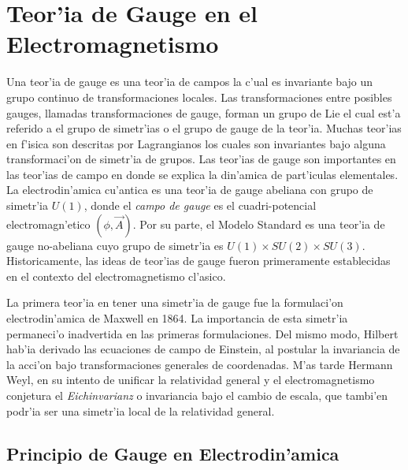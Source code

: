\chapter{Teor'ia de Gauge en el Electromagnetismo}
Una teor'ia de gauge es una teor'ia de campos la c'ual es invariante bajo un grupo continuo de transformaciones locales. Las transformaciones entre posibles gauges, llamadas transformaciones de gauge, forman un grupo de Lie el cual est'a referido a el grupo de simetr'ias o el grupo de gauge de la teor'ia.
Muchas teor'ias en f'isica son descritas por Lagrangianos los cuales son invariantes bajo alguna transformaci'on de simetr'ia de grupos. Las teor'ias de gauge son importantes en las teor'ias de campo en donde se explica la din'amica de part'iculas elementales. La electrodin'amica cu'antica es una teor'ia de gauge abeliana con grupo de simetr'ia $U(1)$, donde el \textit{campo de gauge} es el cuadri-potencial electromagn'etico $(\phi,\vec{A})$. Por su parte, el Modelo Standard es una teor'ia de gauge no-abeliana cuyo grupo de simetr'ia  es $U(1)\times SU(2)\times SU(3)$.
Historicamente, las ideas de teor'ias de gauge fueron primeramente establecidas en el contexto del electromagnetismo cl'asico.

La primera teor'ia en tener una simetr'ia de gauge fue la formulaci'on electrodin'amica de Maxwell en 1864. La importancia de esta simetr'ia permaneci'o inadvertida en las primeras formulaciones. Del mismo modo, Hilbert hab'ia derivado las ecuaciones de campo de Einstein, al postular la invariancia de la acci'on bajo transformaciones generales de coordenadas. M'as tarde Hermann Weyl, en su intento de unificar la relatividad general y el electromagnetismo conjetura el \textit{Eichinvarianz} o invariancia bajo el cambio de escala, que tambi'en podr'ia ser una simetr'ia local de la relatividad general.
\section{Principio de Gauge en Electrodin'amica}
